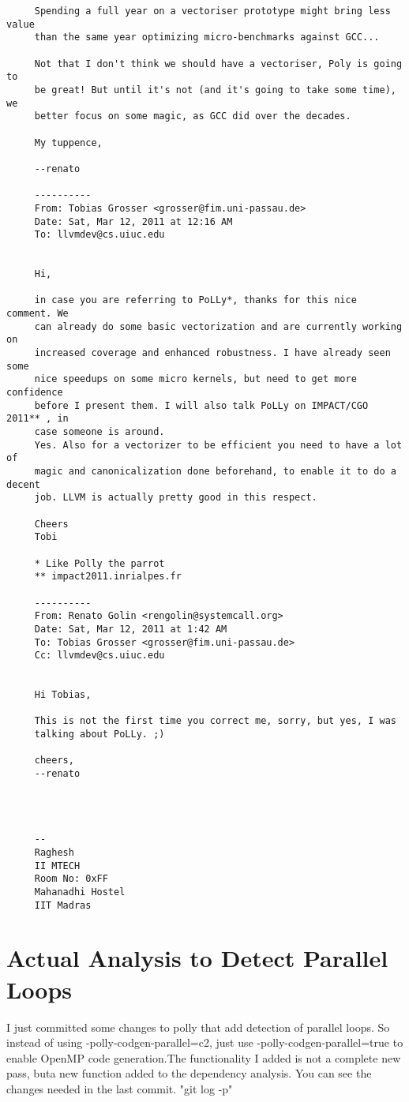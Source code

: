 \documentclass[a4paper,10pt]{article}
\begin{document}
\begin{verbatim}
     Spending a full year on a vectoriser prototype might bring less value
     than the same year optimizing micro-benchmarks against GCC...

     Not that I don't think we should have a vectoriser, Poly is going to
     be great! But until it's not (and it's going to take some time), we
     better focus on some magic, as GCC did over the decades.

     My tuppence,

     --renato

     ----------
     From: Tobias Grosser <grosser@fim.uni-passau.de>
     Date: Sat, Mar 12, 2011 at 12:16 AM
     To: llvmdev@cs.uiuc.edu


     Hi,

     in case you are referring to PoLLy*, thanks for this nice comment. We
     can already do some basic vectorization and are currently working on
     increased coverage and enhanced robustness. I have already seen some
     nice speedups on some micro kernels, but need to get more confidence
     before I present them. I will also talk PoLLy on IMPACT/CGO 2011** , in
     case someone is around.
     Yes. Also for a vectorizer to be efficient you need to have a lot of
     magic and canonicalization done beforehand, to enable it to do a decent
     job. LLVM is actually pretty good in this respect.

     Cheers
     Tobi

     * Like Polly the parrot
     ** impact2011.inrialpes.fr

     ----------
     From: Renato Golin <rengolin@systemcall.org>
     Date: Sat, Mar 12, 2011 at 1:42 AM
     To: Tobias Grosser <grosser@fim.uni-passau.de>
     Cc: llvmdev@cs.uiuc.edu


     Hi Tobias,

     This is not the first time you correct me, sorry, but yes, I was
     talking about PoLLy. ;)

     cheers,
     --renato




     -- 
     Raghesh
     II MTECH
     Room No: 0xFF
     Mahanadhi Hostel
     IIT Madras

\end{verbatim}
\section{Actual Analysis to Detect Parallel Loops}

I just committed some changes to polly that add detection of parallel loops. So instead of using -polly-codgen-parallel=c2, just use -polly-codgen-parallel=true to enable OpenMP code generation.The functionality I added is not a complete new pass, buta new function added to the dependency analysis. You can see the changes needed in the last commit. "git log -p"
\end{document}
